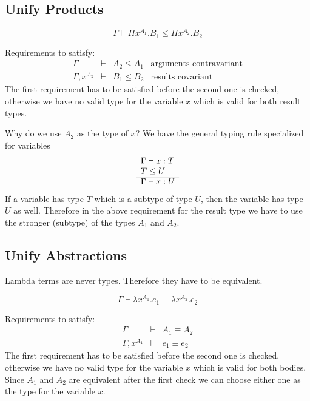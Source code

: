 \subsection{Unify Products}

$$
    \Gamma \vdash \Pi x^{A_1}. B_1 \le \Pi x^{A_2}. B_2
$$

Requirements to satisfy:
$$
\begin{array}{llll}
    \Gamma &\vdash&
    A_2 \le A_1
    &\text{arguments contravariant}
    \\
    \Gamma, x^{A_2} &\vdash&
    B_1 \le B_2
    &\text{results covariant}
\end{array}
$$
The first requirement has to be satisfied before the second one is checked,
otherwise we have no valid type for the variable $x$ which is valid for both
result types.

Why do we use $A_2$ as the type of $x$? We have the general typing rule
specialized for variables
$$
    \begin{array}{l} 
        \Gamma \vdash x : T
        \\
        T \le U
     \\ \hline 
        \Gamma \vdash x: U
     \end{array}
$$
If a variable has type $T$ which is a subtype of type $U$, then the variable has
type $U$ as well. Therefore in the above requirement for the result type we have
to use the stronger (subtype) of the types $A_1$ and $A_2$.






\subsection{Unify Abstractions}

Lambda terms are never types. Therefore they have to be equivalent.

$$
    \Gamma \vdash \lambda x^{A_1}. e_1 \equiv \lambda x^{A_2}. e_2
$$

Requirements to satisfy:
$$
\begin{array}{lll}
    \Gamma &\vdash&
    A_1 \equiv A_2
    \\
    \Gamma, x^{A_1} &\vdash&
    e_1 \equiv e_2
\end{array}
$$
The first requirement has to be satisfied before the second one is checked,
otherwise we have no valid type for the variable $x$ which is valid for both
bodies. Since $A_1$ and $A_2$ are equivalent after the first check we can choose
either one as the type for the variable $x$.






